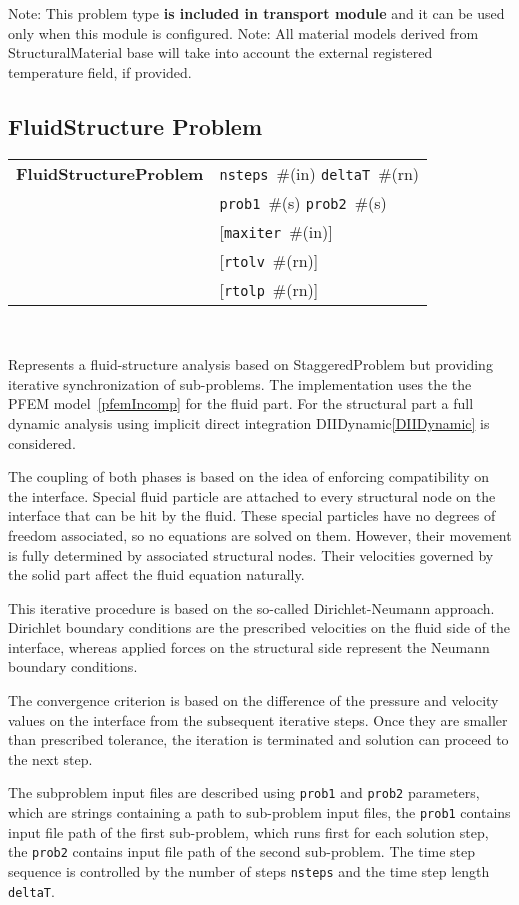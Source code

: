 \documentclass[a4paper]{article}
\newcommand{\param}[1]{\texttt{#1}} %
\newcommand{\optional}[1]{[#1]} %
\newcommand{\field}[2]{\param{#1}~\#{\tiny(#2)}} %
\newcommand{\optField}[2]{\optional{\field{#1}{#2}}}
\newcommand{\entKeywordInst}[1]{\textbf{#1}} %
\newenvironment{record}[1][]{\begin{tabular}{|ll}}{\end{tabular}\\}
\newcommand{\recentry}[2]{{#1}&{#2}\\}
\newcounter{rcc}
\newenvironment{record}[1][\textwidth]{\setcounter{rcc}{0}\rowcolors{1}{lightgray}{lightgray}\tabularx{#1}{llR} \hline}
               {\endtabularx}
\newcommand{\recentry}[2]{\ifthenelse{\value{rcc}>0}{$\backslash$ \\}{\setcounter{rcc}{1}}{#1}&{#2}&}
\begin{document}
Note: This problem type \textbf{is included in transport module} and it
can be used only when this module is configured.
Note: All material models derived from StructuralMaterial base will
take into account the external registered temperature field, if
provided.

\subsection{FluidStructure Problem}
\label{fluidstructureproblem}
\begin{record}
  \recentry{\entKeywordInst{FluidStructureProblem}}{\field{nsteps}{in} \field{deltaT}{rn}}
  \recentry{}{\field{prob1}{s} \field{prob2}{s}}
  \recentry{}{\optField{maxiter}{in}}
  \recentry{}{\optField{rtolv}{rn}}
  \recentry{}{\optField{rtolp}{rn}}
\end{record}

Represents a fluid-structure analysis based on StaggeredProblem but providing
iterative synchronization of sub-problems. The implementation uses the the PFEM
model~\ref{pfemIncomp} for the fluid part. For the structural part a full dynamic
analysis using implicit direct integration DIIDynamic\ref{DIIDynamic} is considered.

The coupling of both phases is based on the idea of enforcing compatibility on the 
interface. Special fluid particle are attached to every structural node on the 
interface that can be hit by the fluid. These special particles have no degrees of 
freedom associated, so no equations are solved on them. However, their movement is 
fully determined by associated structural nodes. Their velocities governed by the 
solid part affect the fluid equation naturally.

This iterative procedure is based on the so-called Dirichlet-Neumann approach.
Dirichlet boundary conditions are the prescribed velocities on the fluid side of
the interface, whereas applied forces on the structural side represent the Neumann
boundary conditions.

The convergence criterion is based on the difference of the pressure and velocity
values on the interface from the subsequent iterative steps. Once they are smaller
than prescribed tolerance, the iteration is terminated and solution can proceed to
the next step.

The subproblem input files are described using
\param{prob1} and \param{prob2} parameters, which are strings
containing a path to sub-problem input files, the \param{prob1}
contains input file path of the first sub-problem, which runs first
for each solution step, the \param{prob2} contains input file path of
the second sub-problem. The time step sequence is controlled by the number of steps
\param{nsteps} and the time step length \param{deltaT}.
\end{document}
